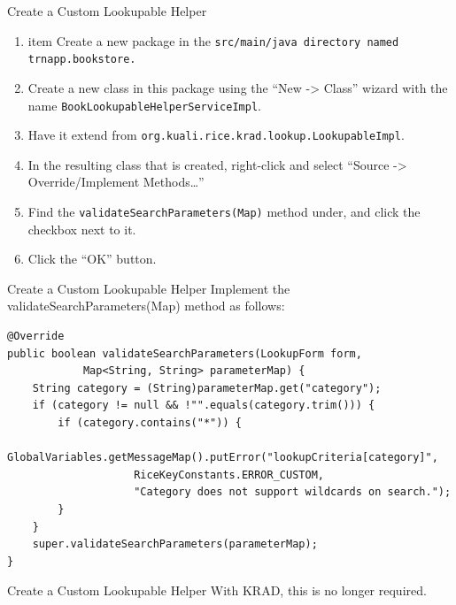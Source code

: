 \documentclass[xcolor=dvipsnames,14pt,professionalfonts]{beamer}
\begin{document}
  \begin{frame}{Create a Custom Lookupable Helper}
 \begin{enumerate}
 \item item Create a new package in the \texttt{src/main/java directory named trnapp.bookstore.}
 \item Create a new class in this package using the “New -> Class”
   wizard with the name \texttt{BookLookupableHelperServiceImpl}.  
 \item Have it extend from \texttt{org.kuali.rice.krad.lookup.LookupableImpl}.
 \item In the resulting class that is created, right-click and select “Source -> Override/Implement Methods…”
 \item Find the \texttt{validateSearchParameters(Map)} method under, and click the checkbox next to it.
 \item Click the “OK” button.
   \end{enumerate}
   \end{frame}

\begin{frame}[fragile]{Create a Custom Lookupable Helper}
 Implement the validateSearchParameters(Map) method as follows:
    \begin{verbatim}
@Override
public boolean validateSearchParameters(LookupForm form,
			Map<String, String> parameterMap) {
	String category = (String)parameterMap.get("category");
	if (category != null && !"".equals(category.trim())) {
		if (category.contains("*")) {
			GlobalVariables.getMessageMap().putError("lookupCriteria[category]", 
                    RiceKeyConstants.ERROR_CUSTOM, 
                    "Category does not support wildcards on search.");
		}
	}
	super.validateSearchParameters(parameterMap);
}
    \end{verbatim}
\end{frame}

\begin{frame}[fragile]{Create a Custom Lookupable Helper}
  With KRAD, this is no longer required.
\end{frame}
\end{document}
